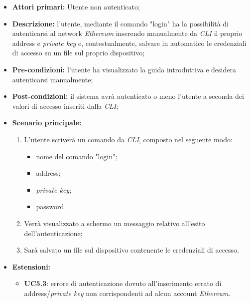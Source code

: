\begin{itemize}
	\item \textbf{Attori primari:} Utente non autenticato;
	\item \textbf{Descrizione:} l'utente, mediante il comando "login" ha la possibilità di autenticarsi al network \textit{Ethereum\glo} inserendo manualmente da \textit{CLI\glo} il proprio address e \textit{private key\glos} e, contestualmente, salvare in automatico le credenziali di accesso su un file sul proprio dispositivo;
	\item \textbf{Pre-condizioni:} l'utente ha visualizzato la guida introduttiva e desidera autenticarsi manualmente;
	\item \textbf{Post-condizioni:} il sistema avrà autenticato o meno l'utente a seconda dei valori di accesso inseriti dalla \textit{CLI\glos};
	\item \textbf{Scenario principale:}
	\begin{enumerate}
		\item L'utente scriverà un comando da \textit{CLI\glos}, composto nel seguente modo:
		\begin{itemize}
			\item nome del comando "login";
			\item address;
			\item \textit{private key\glos};
			\item password
		\end{itemize}
		\item Verrà visualizzato a schermo un messaggio relativo all'esito dell'autenticazione;
		\item Sarà salvato un file sul dispositivo contenente le credenziali di accesso.
	\end{enumerate}
	\item \textbf{Estensioni:} 
	\begin{itemize}
		\item \textbf{UC5.3}: errore di autenticazione dovuto all'inserimento errato di address/\textit{private key\glos} non corrispondenti ad alcun account \textit{Ethereum\glos}.
	\end{itemize}
\end{itemize}
